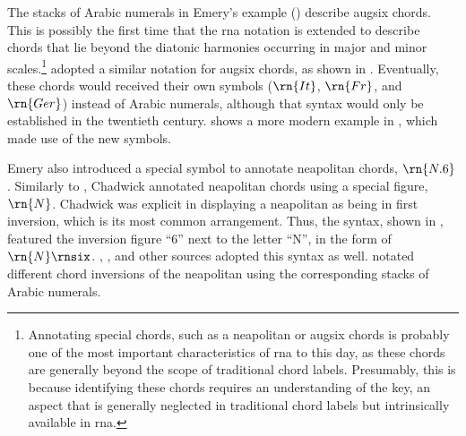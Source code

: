 


The stacks of Arabic numerals in Emery's example
() describe
\gls{augsix} chords. This is possibly the first time that
the \gls{rna} notation is extended to describe chords that
lie beyond the diatonic harmonies occurring in major and
minor scales.\footnote{Annotating special chords, such as a
\gls{neapolitan} or \gls{augsix} chords is probably one of
the most important characteristics of \gls{rna} to this day,
as these chords are generally beyond the scope of
traditional chord labels. Presumably, this is because
identifying these chords requires an understanding of the
key, an aspect that is generally neglected in traditional
chord labels but intrinsically available in \gls{rna}.}
\textcite{shepard1896harmony} adopted a similar notation for
\gls{augsix} chords, as shown in
. Eventually,
these chords would received their own symbols ($\rn{It}$,
$\rn{Fr}$, and $\rn{Ger}$) instead of Arabic numerals,
although that syntax would only be established in the
twentieth century.
 shows a more
modern example in \textcite{goldman1965harmony}, which made
use of the new symbols.



Emery also introduced a special symbol to annotate
\gls{neapolitan} chords, $\rn{N.6}$. Similarly to
\textcite{emery1879elements}, Chadwick annotated
\gls{neapolitan} chords using a special figure, $\rn{N}$.
Chadwick was explicit in displaying a \gls{neapolitan} as
being in first inversion, which is its most common
arrangement. Thus, the syntax, shown in
, featured
the inversion figure ``6'' next to the letter ``N'', in the
form of $\rn{N}\rnsix$. \textcite{heacox1907lessons},
\textcite{alchin1921applied}, and other sources adopted this
syntax as well. \textcite{heacox1907lessons} notated
different chord inversions of the \gls{neapolitan} using the
corresponding stacks of Arabic numerals.

